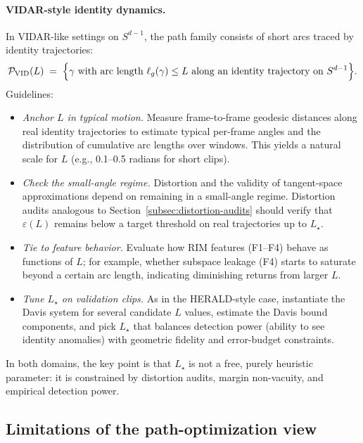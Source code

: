 \documentclass[11pt]{article}
\begin{document}
\paragraph{VIDAR-style identity dynamics.}
In VIDAR-like settings on $S^{d-1}$, the path family consists of short arcs traced by identity
trajectories:
\[
\mathcal{P}_{\mathrm{VID}}(L)
\;=\;
\Bigl\{ \gamma \text{ with arc length } \ell_g(\gamma) \le L \text{ along an identity trajectory on } S^{d-1} \Bigr\}.
\]
Guidelines:
\begin{itemize}[leftmargin=*]
  \item \emph{Anchor $L$ in typical motion.} Measure frame-to-frame geodesic distances along real
  identity trajectories to estimate typical per-frame angles and the distribution of cumulative arc
  lengths over windows. This yields a natural scale for $L$ (e.g., 0.1--0.5 radians for short clips).

  \item \emph{Check the small-angle regime.} Distortion and the validity of tangent-space
  approximations depend on remaining in a small-angle regime. Distortion audits analogous to
  Section~\ref{subsec:distortion-audits} should verify that $\varepsilon(L)$ remains below a target
  threshold on real trajectories up to $L_\star$.

  \item \emph{Tie to feature behavior.} Evaluate how RIM features (F1--F4) behave as functions of
  $L$; for example, whether subspace leakage (F4) starts to saturate beyond a certain arc length,
  indicating diminishing returns from larger $L$.

  \item \emph{Tune $L_\star$ on validation clips.} As in the HERALD-style case, instantiate the
  Davis system for several candidate $L$ values, estimate the Davis bound components, and pick
  $L_\star$ that balances detection power (ability to see identity anomalies) with geometric fidelity
  and error-budget constraints.
\end{itemize}

In both domains, the key point is that $L_\star$ is not a free, purely heuristic parameter: it is
constrained by distortion audits, margin non-vacuity, and empirical detection power.

\subsection{Limitations of the path-optimization view}
\label{subsec:path-limitations}
\end{document}
